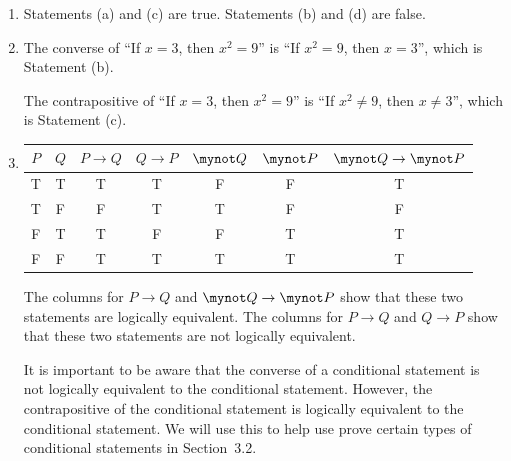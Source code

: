\documentclass[11pt]{article}
\begin{document}
\begin{enumerate}
\item Statements (a) and (c) are true.  Statements (b) and (d) are false.

\item The converse of ``If $x=3$, then $x^2 = 9$'' is ``If $x^2=9$, then $x=3$'', which is Statement (b).

The contrapositive of ``If $x=3$, then $x^2 = 9$'' is ``If  $x^2 \ne 9$, then $x \ne 3$'', which is Statement (c).

\item
\begin{tabular}[t]{| c | c || c | c | c | c | c |}  \hline
$P$  &  $Q$  &  $P \to Q$  &  $Q \to P$  &  $\mynot Q$  &  $\mynot P$  &  
$\mynot  Q \to\mynot  P$ \\ \hline
T  &  T  &  T  &  T  &  F  &  F  &  T  \\ \hline
T  &  F  &  F  &  T  &  T  &  F  &  F  \\ \hline
F  &  T  &  T  &  F  &  F  &  T  &  T  \\ \hline
F  &  F  &  T  &  T  &  T  &  T  &  T  \\ \hline
\end{tabular}

The columns for $P \to Q$ and $\mynot  Q \to\mynot  P$ show that these two statements are logically equivalent.  The columns for $P \to Q$ and $Q \to P$ show that these two statements are not logically equivalent.

It is important to be aware that the converse of a conditional statement is not logically equivalent to the conditional statement.  However, the contrapositive of the conditional statement is logically equivalent to the conditional statement.  We will use this to help use prove certain types of conditional statements in Section~3.2.
\end{enumerate}
\hbreak
\end{document}
